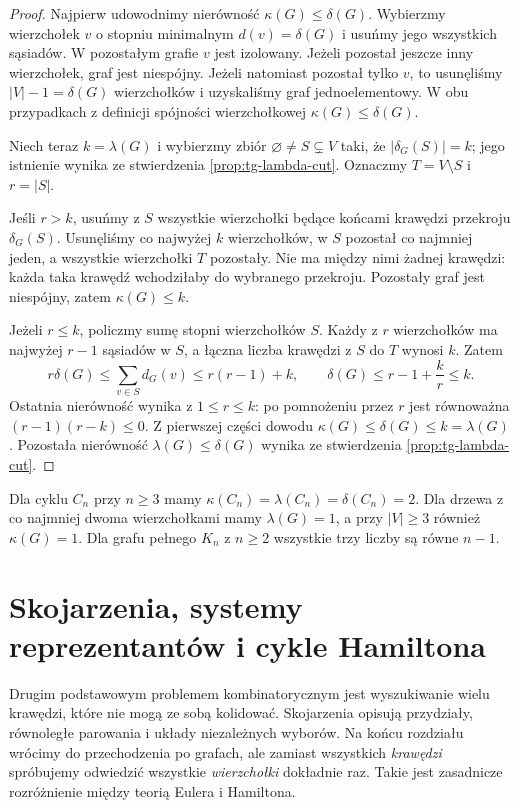 \begin{proof}
Najpierw udowodnimy nierówność $\kappa(G)\le\delta(G)$.
Wybierzmy wierzchołek $v$ o stopniu minimalnym
$d(v)=\delta(G)$ i usuńmy jego wszystkich sąsiadów.
W pozostałym grafie $v$ jest izolowany. Jeżeli pozostał
jeszcze inny wierzchołek, graf jest niespójny.
Jeżeli natomiast pozostał tylko $v$, to usunęliśmy
$|V|-1=\delta(G)$ wierzchołków i uzyskaliśmy
graf jednoelementowy. W obu przypadkach z definicji
spójności wierzchołkowej $\kappa(G)\le\delta(G)$.

Niech teraz $k=\lambda(G)$ i wybierzmy zbiór
$\varnothing\ne S\subsetneq V$ taki, że
$|\delta_G(S)|=k$; jego istnienie wynika ze
stwierdzenia \ref{prop:tg-lambda-cut}. Oznaczmy
$T=V\setminus S$ i $r=|S|$.

Jeśli $r>k$, usuńmy z $S$ wszystkie wierzchołki
będące końcami krawędzi przekroju $\delta_G(S)$.
Usunęliśmy co najwyżej $k$ wierzchołków,
w $S$ pozostał co najmniej jeden, a wszystkie
wierzchołki $T$ pozostały. Nie ma między nimi
żadnej krawędzi: każda taka krawędź wchodziłaby
do wybranego przekroju. Pozostały graf jest
niespójny, zatem $\kappa(G)\le k$.

Jeżeli $r\le k$, policzmy sumę stopni wierzchołków $S$.
Każdy z $r$ wierzchołków ma najwyżej $r-1$
sąsiadów w $S$, a łączna liczba krawędzi
z $S$ do $T$ wynosi $k$. Zatem
\[
r\delta(G)\le\sum_{v\in S}d_G(v)\le r(r-1)+k,
\qquad
\delta(G)\le r-1+\frac{k}{r}\le k.
\]
Ostatnia nierówność wynika z $1\le r\le k$:
po pomnożeniu przez $r$ jest równoważna
$(r-1)(r-k)\le0$. Z pierwszej części dowodu
$\kappa(G)\le\delta(G)\le k=\lambda(G)$.
Pozostała nierówność $\lambda(G)\le\delta(G)$
wynika ze stwierdzenia \ref{prop:tg-lambda-cut}.
\end{proof}



\begin{przyklad}
Dla cyklu $C_n$ przy $n\ge3$ mamy
$\kappa(C_n)=\lambda(C_n)=\delta(C_n)=2$.
Dla drzewa z co najmniej dwoma wierzchołkami mamy
$\lambda(G)=1$, a przy $|V|\ge3$ również $\kappa(G)=1$.
Dla grafu pełnego $K_n$ z $n\ge2$ wszystkie trzy
liczby są równe $n-1$.
\end{przyklad}

\chapter{Skojarzenia, systemy reprezentantów i cykle Hamiltona}
\label{ch:tg-skojarzenia}

Drugim podstawowym problemem kombinatorycznym jest wyszukiwanie
wielu krawędzi, które nie mogą ze sobą kolidować. Skojarzenia
opisują przydziały, równoległe parowania i układy niezależnych
wyborów. Na końcu rozdziału wrócimy do przechodzenia po grafach,
ale zamiast wszystkich \emph{krawędzi} spróbujemy odwiedzić
wszystkie \emph{wierzchołki} dokładnie raz. Takie jest
zasadnicze rozróżnienie między teorią Eulera i Hamiltona.

